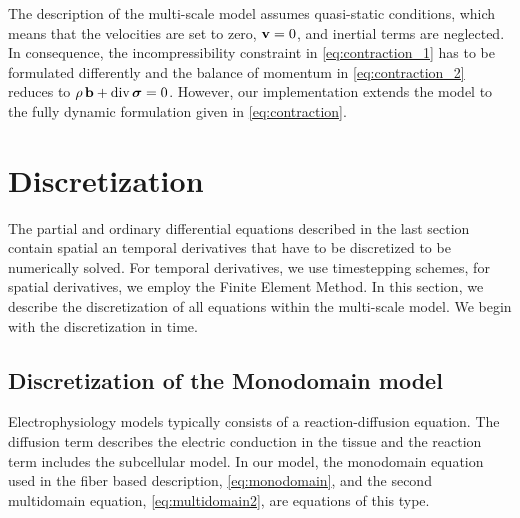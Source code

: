 The description of the multi-scale model \cite{Roehrle2012,Heidlauf2013} assumes quasi-static conditions, which means that the velocities are set to zero, $\textbf{v}=0$, and inertial terms are neglected. In consequence, the incompressibility constraint in \cref{eq:contraction_1} has to be formulated differently and the balance of momentum in \cref{eq:contraction_2} reduces to $\rho\,\textbf{b} + \hbox{div} \, \boldsymbol{\sigma} = 0$.
However, our implementation extends the model to the fully dynamic formulation given in \cref{eq:contraction}.




\section{Discretization}

The partial and ordinary differential equations described in the last section contain spatial an temporal derivatives that have to be discretized to be numerically solved. For temporal derivatives, we use timestepping schemes, for spatial derivatives, we employ the Finite Element Method.
In this section, we describe the discretization of all equations within the multi-scale model. We begin with the discretization in time.

\subsection{Discretization of the Monodomain model}\label{sec:discretization_monodomain}

Electrophysiology models typically consists of a reaction-diffusion equation. The diffusion term describes the electric conduction in the tissue and the reaction term includes the subcellular model. In our model, the monodomain equation used in the fiber based description, \cref{eq:monodomain}, and the second multidomain equation, \cref{eq:multidomain2}, are equations of this type.

